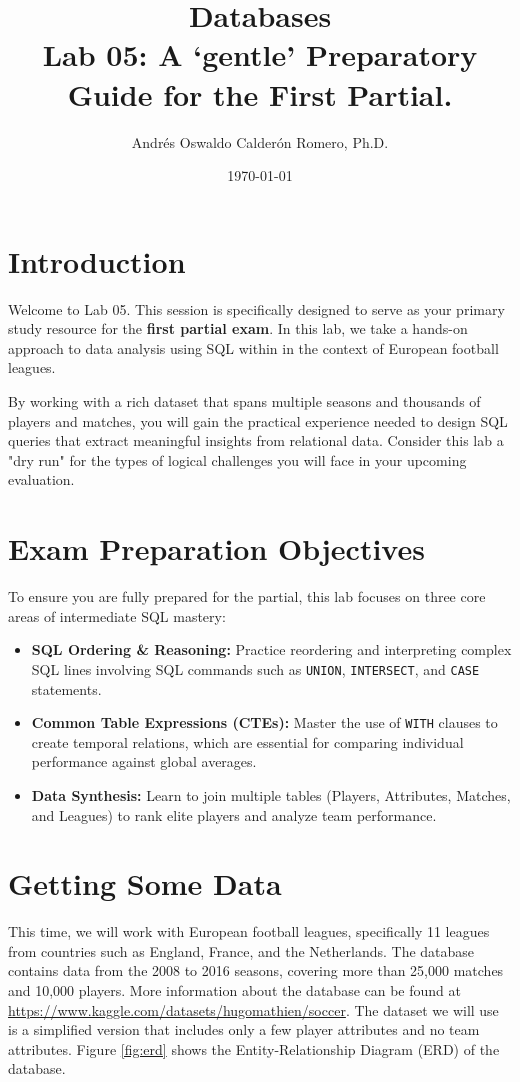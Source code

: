 \documentclass{article}
\title{Databases \\ Lab 05: A `gentle' Preparatory Guide for the First Partial.}
\author{Andrés Oswaldo Calderón Romero, Ph.D.}
\date{\today}
\begin{document}
\maketitle

\section{Introduction}
Welcome to Lab 05. This session is specifically designed to serve as your primary study resource for the \textbf{first partial exam}. In this lab, we take a hands-on approach to data analysis using SQL within in the context of European football leagues.

By working with a rich dataset that spans multiple seasons and thousands of players and matches, you will gain the practical experience needed to design SQL queries that extract meaningful insights from relational data. Consider this lab a "dry run" for the types of logical challenges you will face in your upcoming evaluation.

\section{Exam Preparation Objectives}
To ensure you are fully prepared for the partial, this lab focuses on three core areas of intermediate SQL mastery:

\begin{itemize}
    \item \textbf{SQL Ordering \& Reasoning:} Practice reordering and interpreting complex SQL lines involving SQL commands such as \texttt{UNION}, \texttt{INTERSECT}, and \texttt{CASE} statements.
    \item \textbf{Common Table Expressions (CTEs):} Master the use of \texttt{WITH} clauses to create temporal relations, which are essential for comparing individual performance against global averages.
    \item \textbf{Data Synthesis:} Learn to join multiple tables (Players, Attributes, Matches, and Leagues) to rank elite players and analyze team performance.
\end{itemize}

\section{Getting Some Data}
This time, we will work with European football leagues, specifically 11 leagues from countries such as England, France, and the Netherlands. The database contains data from the 2008 to 2016 seasons, covering more than 25,000 matches and 10,000 players.
More information about the database can be found at \url{https://www.kaggle.com/datasets/hugomathien/soccer}. The dataset we will use is a simplified version that includes only a few player attributes and no team attributes. Figure \ref{fig:erd} shows the Entity-Relationship Diagram (ERD) of the database.
\end{document}
